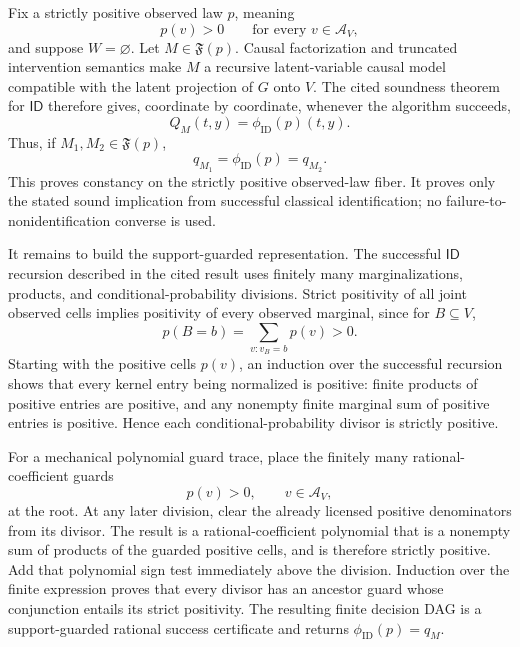 Fix a strictly positive observed law \(p\), meaning
\[
 p(v)>0\qquad\text{for every }v\in\mathcal A_V,
\]
and suppose \(W=\varnothing\).  Let \(M\in\mathfrak F(p)\).  Causal factorization and truncated intervention semantics make \(M\) a recursive latent-variable causal model compatible with the latent projection of \(G\) onto \(V\).  The cited soundness theorem for \(\mathsf{ID}\) therefore gives, coordinate by coordinate, whenever the algorithm succeeds,
\[
 Q_M(t,y)=\phi_{\mathrm{ID}}(p)(t,y).
\]
Thus, if \(M_1,M_2\in\mathfrak F(p)\),
\[
 q_{M_1}=\phi_{\mathrm{ID}}(p)=q_{M_2}.
\]
This proves constancy on the strictly positive observed-law fiber.  It proves only the stated sound implication from successful classical identification; no failure-to-nonidentification converse is used.

It remains to build the support-guarded representation.  The successful \(\mathsf{ID}\) recursion described in the cited result uses finitely many marginalizations, products, and conditional-probability divisions.  Strict positivity of all joint observed cells implies positivity of every observed marginal, since for \(B\subseteq V\),
\[
 p(B=b)=\sum_{v:v_B=b}p(v)>0.
\]
Starting with the positive cells \(p(v)\), an induction over the successful recursion shows that every kernel entry being normalized is positive: finite products of positive entries are positive, and any nonempty finite marginal sum of positive entries is positive.  Hence each conditional-probability divisor is strictly positive.

For a mechanical polynomial guard trace, place the finitely many rational-coefficient guards
\[
 p(v)>0,\qquad v\in\mathcal A_V,
\]
at the root.  At any later division, clear the already licensed positive denominators from its divisor.  The result is a rational-coefficient polynomial that is a nonempty sum of products of the guarded positive cells, and is therefore strictly positive.  Add that polynomial sign test immediately above the division.  Induction over the finite expression proves that every divisor has an ancestor guard whose conjunction entails its strict positivity.  The resulting finite decision DAG is a support-guarded rational success certificate and returns \(\phi_{\mathrm{ID}}(p)=q_M\).

